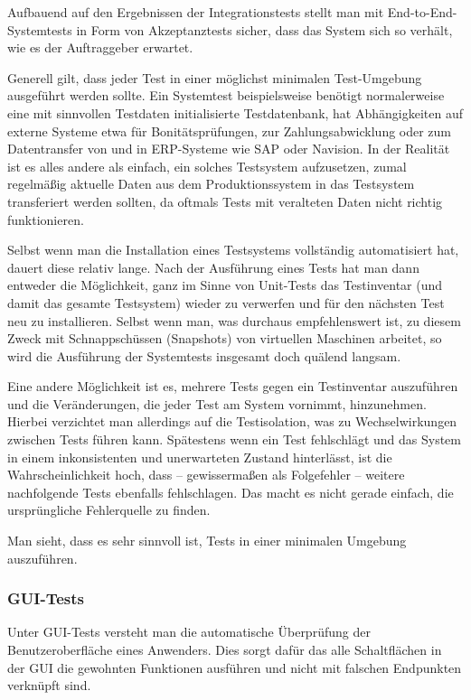 Aufbauend auf den Ergebnissen der Integrationstests stellt man mit End-to-End-Systemtests in Form von Akzeptanztests sicher, dass das System sich so verhält, wie es der Auftraggeber erwartet.

Generell gilt, dass jeder Test in einer möglichst minimalen Test-Umgebung ausgeführt werden sollte. Ein Systemtest beispielsweise benötigt normalerweise eine mit sinnvollen Testdaten initialisierte Testdatenbank, hat Abhängigkeiten auf externe Systeme etwa für Bonitätsprüfungen, zur Zahlungsabwicklung oder zum Datentransfer von und in ERP-Systeme wie SAP oder Navision. In der Realität ist es alles andere als einfach, ein solches Testsystem aufzusetzen, zumal regelmäßig aktuelle Daten aus dem Produktionssystem in das Testsystem transferiert werden sollten, da oftmals Tests mit veralteten Daten nicht richtig funktionieren.

Selbst wenn man die Installation eines Testsystems vollständig automatisiert hat, dauert diese relativ lange. Nach der Ausführung eines Tests hat man dann entweder die Möglichkeit, ganz im Sinne von Unit-Tests das Testinventar (und damit das gesamte Testsystem) wieder zu verwerfen und für den nächsten Test neu zu installieren. Selbst wenn man, was durchaus empfehlenswert ist, zu diesem Zweck mit Schnappschüssen (Snapshots) von virtuellen Maschinen arbeitet, so wird die Ausführung der Systemtests insgesamt doch quälend langsam.

Eine andere Möglichkeit ist es, mehrere Tests gegen ein Testinventar auszuführen und die Veränderungen, die jeder Test am System vornimmt, hinzunehmen. Hierbei verzichtet man allerdings auf die Testisolation, was zu Wechselwirkungen zwischen Tests führen kann. Spätestens wenn ein Test fehlschlägt und das System in einem inkonsistenten und unerwarteten Zustand hinterlässt, ist die Wahrscheinlichkeit hoch, dass – gewissermaßen als Folgefehler – weitere nachfolgende Tests ebenfalls fehlschlagen. Das macht es nicht gerade einfach, die ursprüngliche Fehlerquelle zu finden.

Man sieht, dass es sehr sinnvoll ist, Tests in einer minimalen Umgebung auszuführen.

\subsubsection{GUI-Tests}
Unter GUI-Tests versteht man die automatische Überprüfung der Benutzeroberfläche eines Anwenders. Dies sorgt dafür das alle Schaltflächen in der GUI die gewohnten Funktionen ausführen und nicht mit falschen Endpunkten verknüpft sind.


